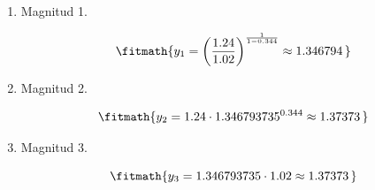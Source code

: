 \begin{enumerate}

\item Magnitud 1.

\[\fitmath{y_{1}={\left(\frac{1.24}{1.02}\right)}^{\frac{1}{1-0.344}}\approx 1.346794\,}\]

\item Magnitud 2.

\[\fitmath{y_{2}=1.24\cdot {1.346793735}^{0.344}\approx 1.37373\,}\]

\item Magnitud 3.

\[\fitmath{y_{3}=1.346793735\cdot 1.02\approx 1.37373\,}\]

\end{enumerate}
